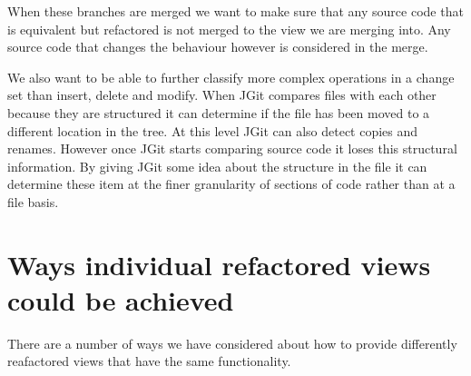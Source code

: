 When these branches are merged we want to make sure that any source code that is equivalent but refactored is not merged to the view we are merging into. Any source code that changes the behaviour however is considered in the merge.

We also want to be able to further classify more complex operations in a change set than insert, delete and modify.  When JGit compares files with each other because they are structured it can determine if the file has been moved to a different location in the tree.  At this level JGit can also detect copies and renames.  However once JGit starts comparing source code it loses this structural information.  By giving JGit some idea about the structure in the file it can determine these item at the finer granularity of sections of code rather than at a file basis.


\section{Ways individual refactored views could be achieved}
There are a number of ways we have considered about how to provide differently reafactored views that have the same functionality.

